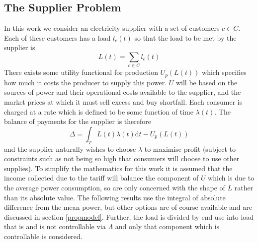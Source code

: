 \documentclass[a4paper, 10 pt, conference]{ieeeconf}  %
\begin{document}
\subsection{The Supplier Problem}
In this work we consider an electricity supplier with a set of customers $c \in C$. Each of these customers has a load $l_{c}(t)$  so that the load to be met by the supplier is
\begin{equation}
L(t) = \sum_{c \in C} l_{c}(t)
\end{equation}
There exists some utility functional for production $U_{p}(L(t))$ which specifies how much it costs the producer to supply this power. $U$ will be based on the sources of power and their operational costs available to the supplier, and the market prices at which it must sell excess and buy shortfall.
Each consumer is charged at a rate which is defined to be some function of time $\lambda (t)$. The balance of payments for the supplier is therefore
\begin{equation}
\Delta = \int_{T}L(t) \lambda(t) \mathrm{d}t - U_{p}(L(t))
\end{equation}
and the supplier naturally wishes to choose $\lambda$ to maximise profit (subject to constraints such as not being so high that consumers will choose to use other supplies). To simplify the mathematics for this work it is assumed that the income collected due to the tariff will balance the component of $U$ which is due to the average power consumption, so are only concerned with the shape of $L$ rather than its absolute value. The following results use the integral of absolute difference from the mean power, but other options are of course available and are discussed in section \ref{propmodel}.
Further, the load is divided by end use into load that is and is not controllable via $\Lambda$ and only that component which is controllable is considered.
\end{document}
